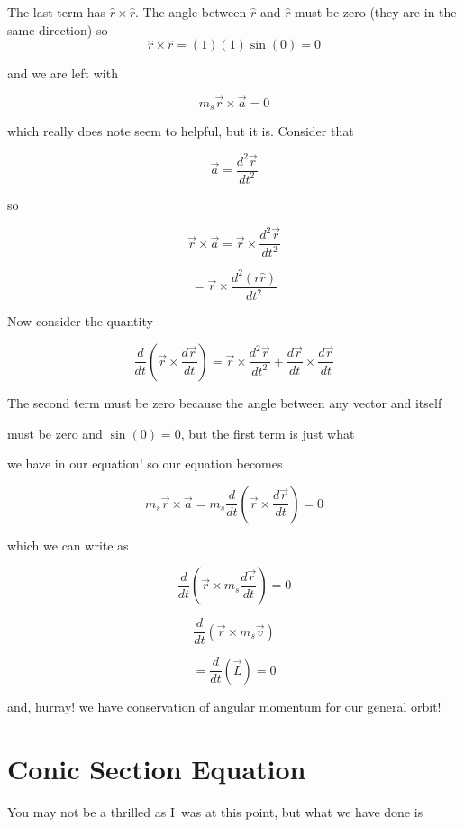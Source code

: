 The last term has $\hat{r}\times \hat{r}.$ The angle between $\hat{r}$ and $\hat{r}$ must be zero (they are in the same direction) so 
$$\hat{r}\times \hat{r}=\left( 1\right) \left( 1\right) \sin \left( 0\right) =0$$

and we are left with 

$$m_{s}\overrightarrow{r}\times \overrightarrow{a}=0$$

which really does note seem to helpful, but it is. Consider that 

$$\overrightarrow{a}=\frac{d^{2}\overrightarrow{r}}{dt^{2}}$$

so 

$$\overrightarrow{r}\times \overrightarrow{a}=\overrightarrow{r}\times \frac{d^{2}\overrightarrow{r}}{dt^{2}}$$

$$=\overrightarrow{r}\times \frac{d^{2}\left( r\hat{r}\right) }{dt^{2}}$$


Now consider the quantity 

$$\frac{d}{dt}\left( \overrightarrow{r}\times \frac{d\overrightarrow{r}}{dt}\right)=\overrightarrow{r}\times\frac{d^{2}\overrightarrow{r}}{dt^{2}}+\frac{d\overrightarrow{r}}{dt}\times \frac{d\overrightarrow{r}}{dt}$$

The second term must be zero because the angle between any vector and itself

must be zero and $\sin \left( 0\right) =0$, but the first term is just what

we have in our equation! so our equation becomes%

$$m_{s}\overrightarrow{r}\times \overrightarrow{a}=m_{s}\frac{d}{dt}\left( \overrightarrow{r}\times \frac{d\overrightarrow{r}}{dt}\right) =0$$

which we can write as%

$$\frac{d}{dt}\left( \overrightarrow{r}\times m_{s}\frac{d\overrightarrow{r}}{dt}\right) =0$$

$$\frac{d}{dt}\left( \overrightarrow{r}\times m_{s}\overrightarrow{v}\right) $$



$$=\frac{d}{dt}\left( \overrightarrow{L}\right) =0$$

and, hurray! we have conservation of angular momentum for our general orbit!


\section{Conic Section Equation}


You may not be a thrilled as I\ was at this point, but what we have done is

